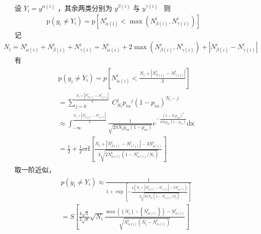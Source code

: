 \documentclass[a4paper,11pt,english]{sphinxmanual}
\begin{document}
\sphinxAtStartPar
  设  \(Y_{i}=y^{\alpha(i)}\) ，其余两类分别为  \(y^{\beta(i)}\) 与  \(y^{\gamma(i) \text { }}\) 则
\begin{equation*}
\begin{split}\mathrm{p}\left(y_{i} \neq Y_{i}\right)=\mathrm{p}\left[N_{\alpha(i)}^{i}<\max \left(N_{\beta(i)}^{i}, N_{\gamma(i)}^{i}\right)\right]\end{split}
\end{equation*}
\sphinxAtStartPar
  记
\begin{equation*}
\begin{split}N_{i}=N_{\alpha(i)}^{i}+N_{\beta(i)}^{i}+N_{\gamma(i)}^{i}=N_{\alpha(i)}^{i}+2 \max \left(N_{\beta(i)}^{i}, N_{\gamma(i)}^{i}\right)+\left|N_{\beta(i)}^{i}-N_{\gamma(i)}^{i}\right|\end{split}
\end{equation*}
\sphinxAtStartPar
  有
\begin{equation*}
\begin{split}\begin{aligned} &\mathrm{p}\left(y_{i} \neq Y_{i}\right)=p\left[N_{\alpha(i)}^{i}<\frac{N_{i}+\left|N_{\beta(i)}^{i}-N_{\gamma(i)}^{i}\right|}{3}\right]\\ &=\sum_{j=0}^\frac{N_{i}+\left|N_{\beta(i)}^{i}-N_{\gamma(i)}^{i}\right|}{3}\ C_{N_{i}}^{j} p_{i \alpha}{ }^{j}\left(1-p_{i \alpha}\right)^{N_{i}-j} \\ &\approx \int_{-\infty}^{\frac{N_{i}+\left|N_{\beta(i)}^{i}-N_{\gamma(i)}^{i}\right|}{3}} \frac{1}{\sqrt{2 \pi N_{i} p_{i \alpha}\left(1-p_{i \alpha}\right)}} e^{-\frac{\left(x-N_{i} p_{i \alpha}\right)^{2}}{2 N_{i} p_{i \alpha}\left(1-p_{i \alpha}\right)}} \mathrm{dx} \\ &=\frac{1}{2}+\frac{1}{2} \text{erf}\left[\frac{N_{i}+\left|N_{\beta(i)}^{i}-N_{\gamma(i)}^{i}\right|-3 N_{a(i)}^{i}}{3 \sqrt{2 N_{\alpha(i)}^{i}\left(1-N_{\alpha(i)}^{i} / N_{i}\right)}}\right] \end{aligned}\end{split}
\end{equation*}
\sphinxAtStartPar
  取一阶近似，
\begin{equation*}
\begin{split}\begin{aligned} &p\left(y_{i} \neq Y_{i}\right) \approx \frac{1}{1+\exp \left[-\frac{4\left(N_{i}+\left|N_{\beta(i)}^{i}-N_{\gamma(i)}^{i}\right|-3 N_{\alpha(i)}^{i}\right)}{3 \sqrt{2 \pi N_{i c}\left(1-N_{\alpha(i)}^{i} / N_{i}\right)}}\right]} \\ &=S\left[\frac{4 \sqrt{2}}{3 \sqrt{\pi}} \sqrt{N_{i}} \frac{\max \left(\left\{N_{i}\right\} \backslash\left\{N_{\alpha(i)}^{i}\right\}\right)-N_{\alpha(i)}^{i}}{\sqrt{N_{\alpha(i)}^{i}\left(N_{i}-N_{\alpha(i)}^{i}\right)}}\right] \end{aligned}\end{split}
\end{equation*}
\end{document}
